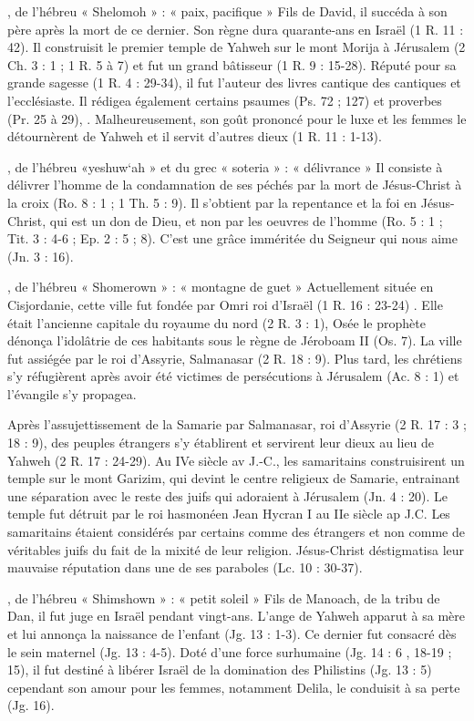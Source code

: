\begin{multicols}{2}
, de l'hébreu « Shelomoh » : « paix, pacifique »
Fils de David, il succéda à son père après la mort de ce dernier. Son règne dura quarante-ans en Israël (1 R. 11 : 42). Il construisit le premier temple de Yahweh sur le mont Morija à Jérusalem (2 Ch. 3 : 1 ; 1 R. 5 à 7) et fut un grand bâtisseur (1 R. 9 : 15-28). Réputé pour sa grande sagesse (1 R. 4 : 29-34), il fut l'auteur des livres cantique des cantiques et l'ecclésiaste. Il rédigea également certains psaumes (Ps. 72 ; 127) et proverbes (Pr. 25 à 29), . Malheureusement, son goût prononcé pour le luxe et les femmes le détournèrent de Yahweh et il servit d'autres dieux (1 R. 11 : 1-13).


, de l'hébreu «yeshuw`ah » et du grec « soteria » : « délivrance »
Il consiste à délivrer l'homme de la condamnation de ses péchés par la mort de Jésus-Christ à la croix (Ro. 8 : 1 ; 1 Th. 5 : 9). Il s'obtient par la repentance et la foi en Jésus-Christ, qui est un don de Dieu, et non par les oeuvres de l'homme (Ro. 5 : 1 ; Tit. 3 : 4-6 ; Ep. 2 : 5 ; 8). C'est une grâce imméritée du Seigneur qui nous aime (Jn. 3 : 16).


, de l'hébreu « Shomerown » : « montagne de guet »
Actuellement située en Cisjordanie, cette ville fut fondée par Omri roi d'Israël (1 R. 16 : 23-24) . Elle était l'ancienne capitale du royaume du nord (2 R. 3 : 1), Osée le prophète dénonça l'idolâtrie de ces habitants sous le règne de Jéroboam II (Os. 7). La ville fut assiégée par le roi d'Assyrie, Salmanasar (2 R. 18 : 9). Plus tard, les chrétiens s'y réfugièrent après avoir été victimes de persécutions à Jérusalem (Ac. 8 : 1) et l'évangile s'y propagea.


Après l'assujettissement de la Samarie par Salmanasar, roi d'Assyrie (2 R. 17 : 3 ; 18 : 9), des peuples étrangers s'y établirent et servirent leur dieux au lieu de Yahweh (2 R. 17 : 24-29). Au IVe siècle av J.-C., les samaritains construisirent un temple sur le mont Garizim, qui devint le centre religieux de Samarie, entrainant une séparation avec le reste des juifs qui adoraient à Jérusalem (Jn. 4 : 20). Le temple fut détruit par le roi hasmonéen Jean Hycran I au IIe siècle ap J.C. Les samaritains étaient considérés par certains comme des étrangers et non comme de véritables juifs du fait de la mixité de leur religion. Jésus-Christ déstigmatisa leur mauvaise réputation dans une de ses paraboles (Lc. 10 : 30-37).


, de l'hébreu « Shimshown » : « petit soleil »
Fils de Manoach, de la tribu de Dan, il fut juge en Israël pendant vingt-ans. L'ange de Yahweh apparut à sa mère et lui annonça la naissance de l'enfant (Jg. 13 : 1-3). Ce dernier fut consacré dès le sein maternel (Jg. 13 : 4-5). Doté d'une force surhumaine (Jg. 14 : 6 , 18-19 ; 15), il fut destiné à libérer Israël de la domination des Philistins (Jg. 13 : 5) cependant son amour pour les femmes, notamment Delila, le conduisit à sa perte (Jg. 16).



\end{multicols}
